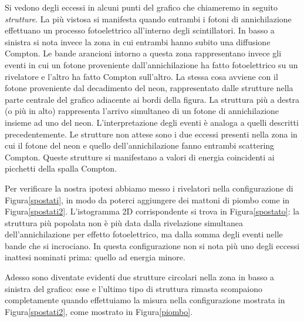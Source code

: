 Si vedono degli eccessi in alcuni punti del grafico che chiameremo in seguito \emph{strutture}. La più vistosa si manifesta quando entrambi i fotoni di annichilazione effettuano un processo fotoelettrico all'interno degli scintillatori. In basso a sinistra si nota invece la zona in cui entrambi hanno subito una diffusione Compton. Le bande arancioni intorno a questa zona rappresentano invece gli eventi in cui un fotone proveniente dall'annichilazione ha fatto fotoelettrico su un rivelatore e l'altro ha fatto Compton sull'altro.
La stessa cosa avviene con il fotone proveniente dal decadimento del neon, rappresentato dalle strutture nella parte centrale del grafico adiacente ai bordi della figura. La struttura più a destra (o più in alto) rappresenta l'arrivo simultaneo di un fotone di annichilazione insieme ad uno del neon. L'interpretazione degli eventi è analoga a quelli descritti precedentemente.
Le strutture non attese sono i due eccessi presenti nella zona in cui il fotone del neon e quello dell'annichilazione fanno entrambi scattering Compton. Queste strutture si manifestano a valori di energia coincidenti ai picchetti della spalla Compton.

Per verificare la nostra ipotesi abbiamo messo i rivelatori nella configurazione di Figura\autoref{spostati}, in modo da poterci aggiungere dei mattoni di piombo come in Figura\autoref{spostati2}. 
L'istogramma 2D corrispondente si trova in Figura\autoref{spostato}: la struttura più popolata non è più data dalla rivelazione simultanea dell'annichilazione per effetto fotoelettrico, ma dalla somma degli eventi nelle bande che si incrociano.
In questa configurazione non si nota più uno degli eccessi inattesi nominati prima: quello ad energia minore.


Adesso sono diventate evidenti due strutture circolari nella zona in basso a sinistra del grafico: esse e l'ultimo tipo di struttura rimasta scompaiono completamente quando effettuiamo la misura nella configurazione mostrata in Figura\autoref{spostati2}, come mostrato in Figura\autoref{piombo}.

